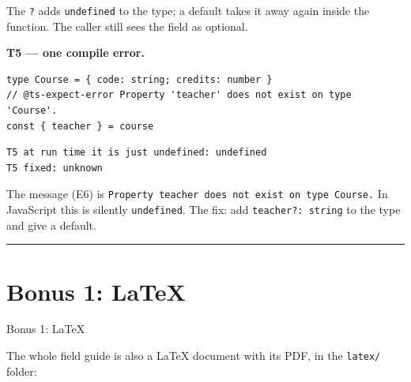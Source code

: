 \documentclass[
  10pt,
]{article}
\begin{document}
The \texttt{?} adds \texttt{undefined} to the type; a default takes it
away again inside the function. The caller still sees the field as
optional.

\textbf{T5 --- one compile error.}

\begin{verbatim}
type Course = { code: string; credits: number }
// @ts-expect-error Property 'teacher' does not exist on type 'Course'.
const { teacher } = course
\end{verbatim}

\begin{verbatim}
T5 at run time it is just undefined: undefined
T5 fixed: unknown
\end{verbatim}

The message (E6) is
\texttt{Property\ \allowbreak{}\textquotesingle{}teacher\allowbreak{}\textquotesingle{}\ does\ not\ exist\ on\ type\ \allowbreak{}\textquotesingle{}Course\allowbreak{}\textquotesingle{}.\allowbreak{}}
In JavaScript this is silently \texttt{undefined}. The fix: add
\texttt{teacher?:\ string} to the type and give a default.

\begin{center}\rule{0.5\linewidth}{0.5pt}\end{center}

\hypertarget{bonus-1-latex}{%
\section{Bonus 1: LaTeX}\label{bonus-1-latex}}

Bonus 1: LaTeX

The whole field guide is also a LaTeX document with its PDF, in the
\texttt{latex/\allowbreak{}} folder:
\end{document}
